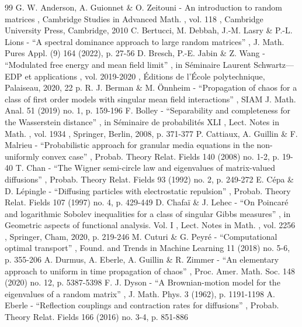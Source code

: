 \documentclass[11pt]{article}
\theoremstyle{plain}
\theoremstyle{definition}
\begin{document}

\begin{thebibliography}{99}
 G. W. Anderson, A. Guionnet \& O. Zeitouni - An introduction to random matrices , Cambridge Studies in Advanced Math. , vol. 118 , Cambridge University Press, Cambridge, 2010
 C. Bertucci, M. Debbah, J.-M. Lasry \& P.-L. Lions - “A spectral dominance approach to large random matrices” , J. Math. Pures Appl. (9) 164 (2022), p. 27-56
 D. Bresch, P.-E. Jabin \& Z. Wang - “Modulated free energy and mean field limit” , in Séminaire Laurent Schwartz—EDP et applications , vol. 2019-2020 , Éditions de l’École polytechnique, Palaiseau, 2020, 22 p.
 R. J. Berman \& M. Önnheim - “Propagation of chaos for a class of first order models with singular mean field interactions” , SIAM J. Math. Anal. 51 (2019) no. 1, p. 159-196
 F. Bolley - “Separability and completeness for the Wasserstein distance” , in Séminaire de probabilités XLI , Lect. Notes in Math. , vol. 1934 , Springer, Berlin, 2008, p. 371-377
 P. Cattiaux, A. Guillin \& F. Malrieu - “Probabilistic approach for granular media equations in the non-uniformly convex case” , Probab. Theory Relat. Fields 140 (2008) no. 1-2, p. 19-40
 T. Chan - “The Wigner semi-circle law and eigenvalues of matrix-valued diffusions” , Probab. Theory Relat. Fields 93 (1992) no. 2, p. 249-272
 E. Cépa \& D. Lépingle - “Diffusing particles with electrostatic repulsion” , Probab. Theory Relat. Fields 107 (1997) no. 4, p. 429-449
 D. Chafaï \& J. Lehec - “On Poincaré and logarithmic Sobolev inequalities for a class of singular Gibbs measures” , in Geometric aspects of functional analysis. Vol. I , Lect. Notes in Math. , vol. 2256 , Springer, Cham, 2020, p. 219-246
 M. Cuturi \& G. Peyré - “Computational optimal transport” , Found. and Trends in Machine Learning 11 (2018) no. 5-6, p. 355-206
 A. Durmus, A. Eberle, A. Guillin \& R. Zimmer - “An elementary approach to uniform in time propagation of chaos” , Proc. Amer. Math. Soc. 148 (2020) no. 12, p. 5387-5398
 F. J. Dyson - “A Brownian-motion model for the eigenvalues of a random matrix” , J. Math. Phys. 3 (1962), p. 1191-1198
 A. Eberle - “Reflection couplings and contraction rates for diffusions” , Probab. Theory Relat. Fields 166 (2016) no. 3-4, p. 851-886

\end{thebibliography}
\end{document}
